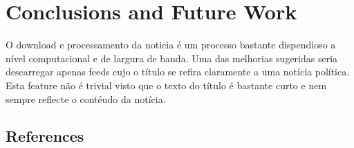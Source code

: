 \section{Conclusions and Future Work}
O download e processamento da noticia é um processo bastante dispendioso a nível computacional e de largura de banda. Uma das melhorias sugeridas seria descarregar apenas feeds cujo o título se refira claramente a uma notícia política. Esta feature não é trivial visto que o texto do título é bastante curto e nem sempre reflecte o contéudo da notícia.
\subsection{References}